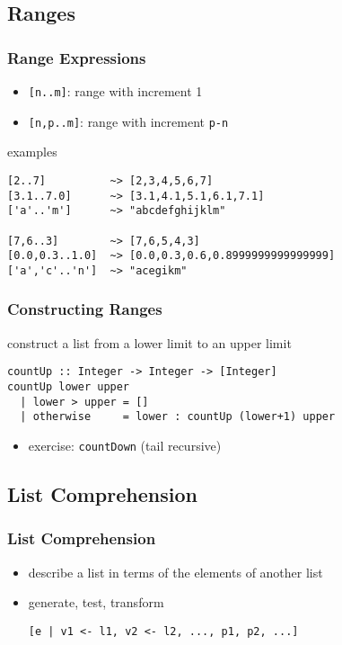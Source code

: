 \documentclass[dvipsnames]{beamer}
\theoremstyle{plain}
\begin{document}
\subsection{Ranges}

\begin{frame}[fragile]
  \frametitle{Range Expressions}

  \begin{itemize}
    \item \lstinline{[n..m]}: range with increment 1
    \item \lstinline{[n,p..m]}: range with increment \texttt{p-n}
  \end{itemize}

  \begin{exampleblock}{examples}
    \begin{lstlisting}
[2..7]          ~> [2,3,4,5,6,7]
[3.1..7.0]      ~> [3.1,4.1,5.1,6.1,7.1]
['a'..'m']      ~> "abcdefghijklm"

[7,6..3]        ~> [7,6,5,4,3]
[0.0,0.3..1.0]  ~> [0.0,0.3,0.6,0.8999999999999999]
['a','c'..'n']  ~> "acegikm"
    \end{lstlisting}
  \end{exampleblock}
\end{frame}

\begin{frame}[fragile]
  \frametitle{Constructing Ranges}

  \begin{exampleblock}{construct a list from a lower limit to an upper limit}
    \begin{lstlisting}
countUp :: Integer -> Integer -> [Integer]
countUp lower upper
  | lower > upper = []
  | otherwise     = lower : countUp (lower+1) upper
    \end{lstlisting}
  \end{exampleblock}

  \pause
  \begin{itemize}
    \item exercise: \lstinline{countDown} (tail recursive)
  \end{itemize}
\end{frame}

\subsection{List Comprehension}

\begin{frame}[fragile]
  \frametitle{List Comprehension}

  \begin{itemize}
    \item describe a list in terms of the elements of another list
    \item generate, test, transform

    \medskip
    \begin{lstlisting}
[e | v1 <- l1, v2 <- l2, ..., p1, p2, ...]
    \end{lstlisting}
  \end{itemize}
\end{frame}
\end{document}
